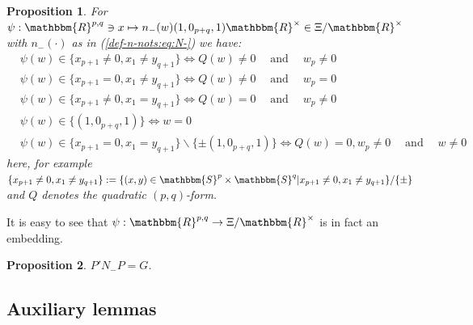 \documentclass{article}
\newcommand{\assign}{:=}
\newcommand{\nocomma}{}
\newcommand{\tmop}[1]{\ensuremath{\operatorname{#1}}}
\numberwithin{definition}{section}
\numberwithin{lemma}{section}
\newtheorem{proposition}{Proposition}
\numberwithin{proposition}{section}
{\theorembodyfont{\rmfamily}\newtheorem{remark}{Remark}
\numberwithin{remark}{section}
}
\begin{document}
\begin{proposition}
  \label{doublePGP:prop-pullback-of-orbits}For $\psi : \mathbbm{R}^{p, q} \ni
  x \mapsto n_- ( w) ( 1, 0_{p + q}, 1) \mathbbm{R}^{\times} \in \Xi
  /\mathbbm{R}^{\times}$ with $n_- ( \cdot)$ as in (\ref{def-n-nots:eq:N-}) we
  have:
  \begin{eqnarray}
    & \psi ( w) \in \{ x_{p + 1} \neq 0, x_1 \neq y_{q + 1} \}
    \Leftrightarrow Q ( w) \neq 0 \hspace{1em} \tmop{and} \hspace{1em} w_p
    \neq 0 &  \nonumber\\
    & \psi ( w) \in \{ x_{p + 1} = 0, x_1 \neq y_{q + 1} \} \Leftrightarrow Q
    ( w) \neq 0 \hspace{1em} \tmop{and} \hspace{1em} w_p = 0 &  \nonumber\\
    & \psi ( w) \in \{ x_{p + 1} \neq 0, x_1 = y_{q + 1} \} \Leftrightarrow Q
    ( w) = 0 \hspace{1em} \tmop{and} \hspace{1em} w_p \neq 0 &  \nonumber\\
    & \psi ( w) \in \{ ( 1, 0_{p + q}, 1) \} \Leftrightarrow w = 0 & 
    \nonumber\\
    & \psi ( w) \in \{ x_{p + 1} = 0, x_1 = y_{q + 1} \} \backslash \{ \pm (
    1, 0_{p + q}, 1) \} \Leftrightarrow Q ( w) = 0 \nocomma, w_p \neq 0
    \hspace{1em} \tmop{and} \hspace{1em} w \neq 0 &  \nonumber
  \end{eqnarray}
  here, for example $\{ x_{p + 1} \neq 0, x_1 \neq y_{q + 1} \} \assign \{ (
  x, y) \in \mathbbm{S}^p \times \mathbbm{S}^q | x_{p + 1} \neq 0, x_1 \neq
  y_{q + 1} \} / \{ \pm \}$ and $Q$ denotes the quadratic $( p, q)$-form.
\end{proposition}

\begin{remark}
  It is easy to see that $\psi : \mathbbm{R}^{p, q} \rightarrow \Xi
  /\mathbbm{R}^{\times}$ is in fact an embedding.
\end{remark}

\begin{proposition}
  \label{doublePGP:prop-pnp}$P' N_- P = G$.
\end{proposition}

\subsection{Auxiliary lemmas}
\end{document}

